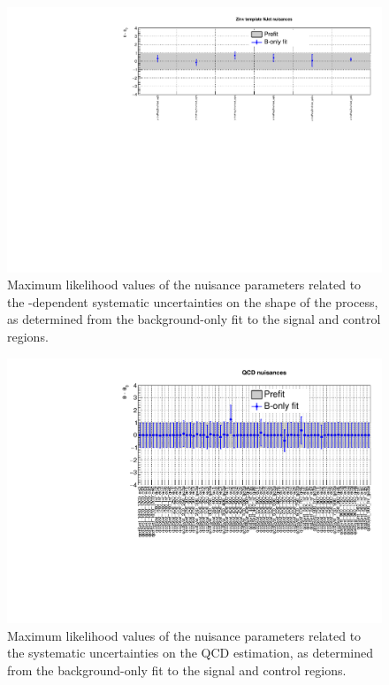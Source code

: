 \begin{figure}[h!]
	\centering
	\includegraphics[width=1.\linewidth]{figs/results/nuis/TemplateZinv_njet_nuisances}
	\caption{Maximum likelihood values of the nuisance parameters related to 
	the \njet-dependent systematic uncertainties on the \mht shape of the \znnj 
	process, as determined from the background-only fit to the signal and 
	control regions.}
\end{figure}

\begin{figure}[h!]
	\centering
	\includegraphics[width=1.\linewidth]{figs/results/nuis/qcd_nuisances}
	\caption{Maximum likelihood values of the nuisance parameters related to 
	the systematic uncertainties on the QCD estimation, as determined from the 
	background-only fit to the signal and control regions.}
\end{figure}


